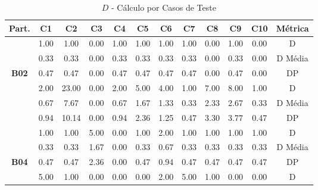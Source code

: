 \begin{table}[htbp]
	\centering
	\caption{$D$ - Cálculo por Casos de Teste}
	\begin{tabular}{|c|c|c|c|c|c|c|c|c|c|c|c}
		\hline
		\rowcolor[HTML]{D9D9D9} 
		\cellcolor[HTML]{D0CECE}\textbf{Part.} & \textbf{C1} & \textbf{C2} & \textbf{C3} & \textbf{C4} & \textbf{C5} & \textbf{C6} & \textbf{C7} & \textbf{C8} & \textbf{C9} & \textbf{C10} & \multicolumn{1}{c|}{\cellcolor[HTML]{D0CECE}\textbf{Métrica}} \\ \hline
		\cellcolor[HTML]{F2F2F2} & 1.00 & 1.00 & 0.00 & 1.00 & 1.00 & 1.00 & 1.00 & 0.00 & 1.00 & 0.00 & \multicolumn{1}{c|}{D} \\ \cline{2-12} 
		\rowcolor[HTML]{D9D9D9} 
		\cellcolor[HTML]{F2F2F2} & 0.33 & 0.33 & 0.00 & 0.33 & 0.33 & 0.33 & 0.33 & 0.00 & 0.33 & 0.00 & \multicolumn{1}{c|}{\cellcolor[HTML]{D9D9D9}D Média} \\ \cline{2-12} 
		\multirow{-3}{*}{\cellcolor[HTML]{F2F2F2}\textbf{B02}} & 0.47 & 0.47 & 0.00 & 0.47 & 0.47 & 0.47 & 0.47 & 0.00 & 0.47 & 0.00 & \multicolumn{1}{c|}{DP} \\ \hline
		\rowcolor[HTML]{D9D9D9} 
		\cellcolor[HTML]{F2F2F2} & 2.00 & 23.00 & 0.00 & 2.00 & 5.00 & 4.00 & 1.00 & 7.00 & 8.00 & 1.00 & \multicolumn{1}{c|}{\cellcolor[HTML]{D9D9D9}D} \\ \cline{2-12} 
		\cellcolor[HTML]{F2F2F2} & 0.67 & 7.67 & 0.00 & 0.67 & 1.67 & 1.33 & 0.33 & 2.33 & 2.67 & 0.33 & \multicolumn{1}{c|}{D Média} \\ \cline{2-12} 
		\rowcolor[HTML]{D9D9D9} 
		\multirow{-3}{*}{\cellcolor[HTML]{F2F2F2}\textbf{B03}} & 0.94 & 10.14 & 0.00 & 0.94 & 2.36 & 1.25 & 0.47 & 3.30 & 3.77 & 0.47 & \multicolumn{1}{c|}{\cellcolor[HTML]{D9D9D9}DP} \\ \hline
		\cellcolor[HTML]{F2F2F2} & 1.00 & 1.00 & 5.00 & 0.00 & 1.00 & 2.00 & 1.00 & 1.00 & 1.00 & 1.00 & \multicolumn{1}{c|}{D} \\ \cline{2-12} 
		\rowcolor[HTML]{D9D9D9} 
		\cellcolor[HTML]{F2F2F2} & 0.33 & 0.33 & 1.67 & 0.00 & 0.33 & 0.67 & 0.33 & 0.33 & 0.33 & 0.33 & \multicolumn{1}{c|}{\cellcolor[HTML]{D9D9D9}D Média} \\ \cline{2-12} 
		\multirow{-3}{*}{\cellcolor[HTML]{F2F2F2}\textbf{B04}} & 0.47 & 0.47 & 2.36 & 0.00 & 0.47 & 0.94 & 0.47 & 0.47 & 0.47 & 0.47 & \multicolumn{1}{c|}{DP} \\ \hline
		\rowcolor[HTML]{D9D9D9} 
		\cellcolor[HTML]{F2F2F2} & 5.00 & 1.00 & 0.00 & 0.00 & 0.00 & 2.00 & 5.00 & 1.00 & 0.00 & 0.00 & \multicolumn{1}{c|}{\cellcolor[HTML]{D9D9D9}D} \\ \cline{2-12} 

\end{tabular}
\end{table}
